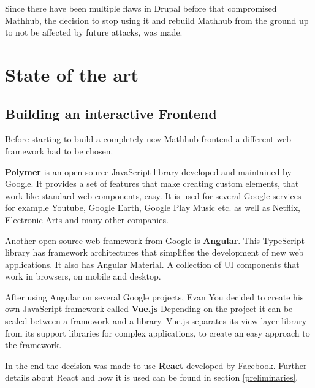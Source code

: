 \documentclass[11pt,a4paper]{article}
\begin{document}
Since there have been multiple flaws in Drupal before that compromised Mathhub, the decision to stop using it and rebuild Mathhub from the ground up to not be affected by future attacks, was made.

\section{State of the art}
\subsection{Building an interactive Frontend}
Before starting to build a completely new Mathhub frontend a different web framework had to be chosen.

\textbf{Polymer} is an open source JavaScript library developed and maintained by Google.
It provides a set of features that make creating custom elements, that work like standard web components, easy.
It is used for several Google services for example Youtube, Google Earth, Google Play Music etc. as well as Netflix, Electronic Arts and many other companies. \cite{polymer}

Another open source web framework from Google is \textbf{Angular}.
This TypeScript library has framework architectures that simplifies the development of new web applications.
It also has Angular Material.
A collection of UI components that work in browsers, on mobile and desktop. \cite{angular}

After using Angular on several Google projects, Evan You decided to create his own JavaScript framework called \textbf{Vue.js} \cite{vuewiki}
Depending on the project it can be scaled between a framework and a library.
Vue.js separates its view layer library from its support libraries for complex applications, to create an easy approach to the framework. \cite{vuegit}

In the end the decision was made to use \textbf{React} developed by Facebook.
Further details about React and how it is used can be found in section \ref{preliminaries}.
\end{document}
